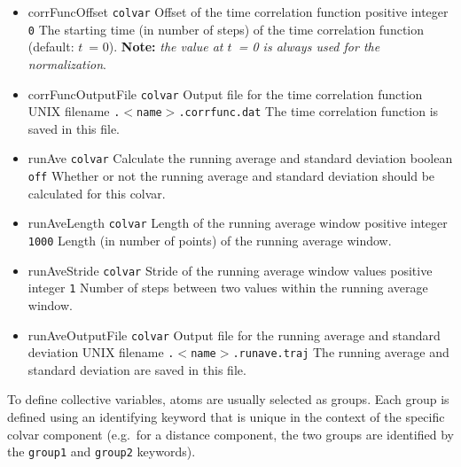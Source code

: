 \begin{itemize}
\item %
  \keydef
    {corrFuncOffset}{%
    \texttt{colvar}}{%
    Offset of the time correlation function}{%
    positive integer}{%
    \texttt{0}}{%
    The starting time (in number of steps) of the time correlation
    function (default: $t$~= 0).  \textbf{Note:} \emph{the value at $t$~= 0 is always
    used for the normalization}.}

\item %
  \keydef
    {corrFuncOutputFile}{%
    \texttt{colvar}}{%
    Output file for the time correlation function}{%
    UNIX filename}{%
    \outputName\texttt{.$<$name$>$.corrfunc.dat}}{%
    The time correlation function is saved in this file.}

\item %
  \keydef
    {runAve}{%
    \texttt{colvar}}{%
    Calculate the running average and standard deviation}{%
    boolean}{%
    \texttt{off}}{%
    Whether or not the running average and standard deviation should
    be calculated for this colvar.}

\item %
  \keydef
    {runAveLength}{%
    \texttt{colvar}}{%
    Length of the running average window}{%
    positive integer}{%
    \texttt{1000}}{%
    Length (in number of points) of the running average window.}

\item %
  \keydef
    {runAveStride}{%
    \texttt{colvar}}{%
    Stride of the running average window values}{%
    positive integer}{%
    \texttt{1}}{%
    Number of steps between two values within the running average window.}

\item %
  \keydef
    {runAveOutputFile}{%
    \texttt{colvar}}{%
    Output file for the running average and standard deviation}{%
    UNIX filename}{%
    \outputName\texttt{.$<$name$>$.runave.traj}}{%
    The running average and standard deviation are saved in this file.}

\end{itemize}



To define collective variables, atoms are usually selected as groups.  Each group is defined using an identifying keyword that is unique in the context of the specific colvar component (e.g.~for a distance component, the two groups are identified by the \texttt{group1} and \texttt{group2} keywords).

